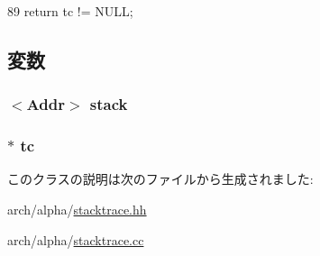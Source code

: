\begin{DoxyCode}
89 { return tc != NULL; }
\end{DoxyCode}


\subsection{変数}
\hypertarget{classAlphaISA_1_1StackTrace_a8be39169db4f31c77f5188de23c602f1}{
\subsubsection[{stack}]{$<${\bf Addr}$>$ {\bf stack}}}
\label{classAlphaISA_1_1StackTrace_a8be39169db4f31c77f5188de23c602f1}
\hypertarget{classAlphaISA_1_1StackTrace_a4455a4759e69e5ebe68ae7298cbcc37d}{
\subsubsection[{tc}]{$\ast$ {\bf tc}}}
\label{classAlphaISA_1_1StackTrace_a4455a4759e69e5ebe68ae7298cbcc37d}


このクラスの説明は次のファイルから生成されました:\begin{DoxyCompactItemize}
\item 
arch/alpha/\hyperlink{alpha_2stacktrace_8hh}{stacktrace.hh}\item 
arch/alpha/\hyperlink{alpha_2stacktrace_8cc}{stacktrace.cc}\end{DoxyCompactItemize}

